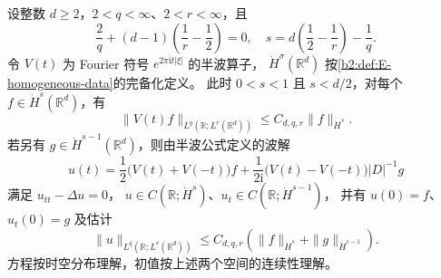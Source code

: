 \begin{theorem}[全频率边界非端点半波估计]\label{b2:thm:E-wave-nonendpoint}
设整数 \(d\ge2\)，\(2<q<\infty\)、\(2<r<\infty\)，且
\[
 \frac2q+(d-1)\left(\frac1r-\frac12\right)=0,
 \quad
 s=d\left(\frac12-\frac1r\right)-\frac1q.
\]
令 \(V(t)\) 为 Fourier 符号 \(e^{2\pi\mathrm it|\xi|}\) 的半波算子，
\(\dot H^\sigma(\mathbb R^d)\) 按\cref{b2:def:E-homogeneous-data}的完备化定义。
此时 \(0<s<1\) 且 \(s<d/2\)，对每个 \(f\in\dot H^s(\mathbb R^d)\)，有
\[
 \|V(t)f\|_{L^q(\mathbb R;L^r(\mathbb R^d))}
 \le C_{d,q,r}\|f\|_{\dot H^s}.
\]
若另有 \(g\in\dot H^{s-1}(\mathbb R^d)\)，则由半波公式定义的波解
\[
 u(t)=\frac12\bigl(V(t)+V(-t)\bigr)f
 +\frac1{2\mathrm i}\bigl(V(t)-V(-t)\bigr)|D|^{-1}g
\]
满足 \(u_{tt}-\Delta u=0\)，
\(u\in C(\mathbb R;\dot H^s)\)、\(u_t\in C(\mathbb R;\dot H^{s-1})\)，
并有 \(u(0)=f\)、\(u_t(0)=g\) 及估计
\[
 \|u\|_{L^q(\mathbb R;L^r(\mathbb R^d))}
 \le C_{d,q,r}
       \left(\|f\|_{\dot H^s}+\|g\|_{\dot H^{s-1}}\right).
\]
方程按时空分布理解，初值按上述两个空间的连续性理解。
\end{theorem}
